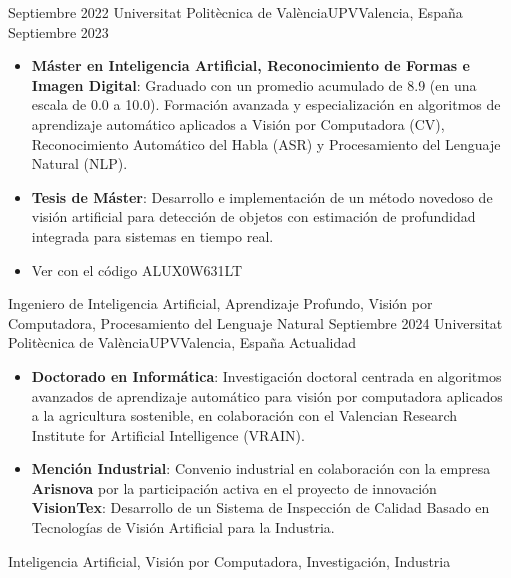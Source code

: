 \begin{experiences}
\emptySeparator
  \experience
    {Septiembre 2022} {Universitat Politècnica de València}{UPV}{Valencia, España}
    {Septiembre 2023}    {
                      \begin{itemize}
                        \item \textbf{Máster en Inteligencia Artificial, Reconocimiento de Formas e Imagen Digital}: Graduado con un promedio acumulado de 8.9 (en una escala de 0.0 a 10.0). Formación avanzada y especialización en algoritmos de aprendizaje automático aplicados a Visión por Computadora (CV), Reconocimiento Automático del Habla (ASR) y Procesamiento del Lenguaje Natural (NLP).
                        \item \textbf{Tesis de Máster}: Desarrollo e implementación de un método novedoso de visión artificial para detección de objetos con estimación de profundidad integrada para sistemas en tiempo real. \href{https://riunet.upv.es/handle/10251/198268}{\color{CadetBlue}{[Explorar Tesis]}}
                        \item Ver \href{https://sede.upv.es/eVerificador}{\color{CadetBlue}{Certificado}} con el código ALUX0W631LT
                      \end{itemize}
                    }
                    {Ingeniero de Inteligencia Artificial, Aprendizaje Profundo, Visión por Computadora, Procesamiento del Lenguaje Natural}
\emptySeparator
  \experience
    {Septiembre 2024} {Universitat Politècnica de València}{UPV}{Valencia, España}
    {Actualidad}    {
                      \begin{itemize}
                        \item \textbf{Doctorado en Informática}: Investigación doctoral centrada en algoritmos avanzados de aprendizaje automático para visión por computadora aplicados a la agricultura sostenible, en colaboración con el Valencian Research Institute for Artificial Intelligence (VRAIN).
                        \item \textbf{Mención Industrial}: Convenio industrial en colaboración con la empresa \textbf{Arisnova} por la participación activa en el proyecto de innovación \textbf{VisionTex}: Desarrollo de un Sistema de Inspección de Calidad Basado en Tecnologías de Visión Artificial para la Industria.
                      \end{itemize}
                    }
                    {Inteligencia Artificial, Visión por Computadora, Investigación, Industria}
\end{experiences}

